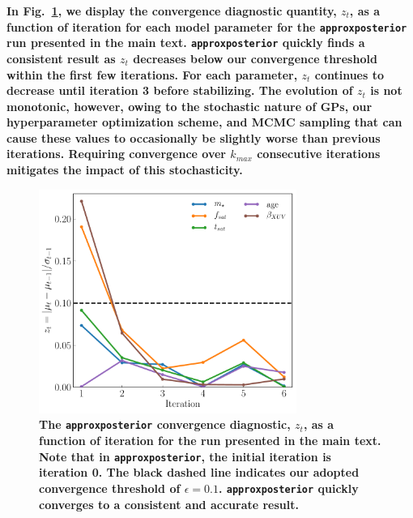 \documentclass[twocolumn]{aastex62}
\newcommand{\xxx}[1]{{\textbf{#1}}}
\newcommand{\approxposterior}[0]{\texttt{approxposterior}\xspace}
\begin{document}
\xxx{In Fig.~\ref{fig:convergence}, we display the convergence diagnostic quantity, $z_t$, as a function of iteration for each model parameter for the \approxposterior run presented in the main text. \approxposterior quickly finds a consistent result as $z_t$ decreases below our convergence threshold within the first few iterations. For each parameter, $z_t$ continues to decrease until iteration 3 before stabilizing. The evolution of $z_t$ is not monotonic, however, owing to the stochastic nature of GPs, our hyperparameter optimization scheme, and MCMC sampling that can cause these values to occasionally be slightly worse than previous iterations. Requiring convergence over $k_{max}$ consecutive iterations mitigates the impact of this stochasticity.}

\begin{figure}[h]
\centering
	\includegraphics[width=0.75\textwidth]{../Analysis/Convergence/convergence.pdf}
   \caption{\xxx{The \approxposterior convergence diagnostic, $z_t$, as a function of iteration for the run presented in the main text. Note that in \approxposterior, the initial iteration is iteration 0. The black dashed line indicates our adopted convergence threshold of $\epsilon = 0.1$. \textbf{\approxposterior quickly converges to a consistent and accurate result.}}}%
    \label{fig:convergence}%
\end{figure}
\end{document}
